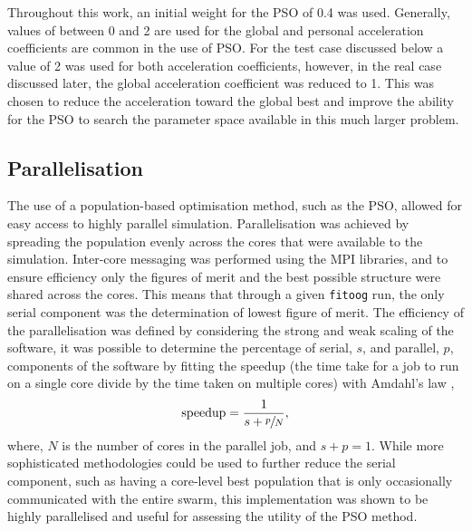 Throughout this work, an initial weight for the PSO of 0.4 was used.
Generally, values of between 0 and 2 are used for the global and personal acceleration coefficients are common in the use of PSO.
For the test case discussed below a value of 2 was used for both acceleration coefficients, however, in the real case discussed later, the global acceleration coefficient was reduced to 1.
This was chosen to reduce the acceleration toward the global best and improve the ability for the PSO to search the parameter space available in this much larger problem.

\subsection{Parallelisation}
\label{sec:para}
The use of a population-based optimisation method, such as the PSO, allowed for easy access to highly parallel simulation.
Parallelisation was achieved by spreading the population evenly across the cores that were available to the simulation.
Inter-core messaging was performed using the MPI libraries, and to ensure efficiency only the figures of merit and the best possible structure were shared across the cores.
This means that through a given \texttt{fitoog} run, the only serial component was the determination of lowest figure of merit.
The efficiency of the parallelisation was defined by considering the strong and weak scaling of the software, it was possible to determine the percentage of serial, $s$, and parallel, $p$, components of the software by fitting the speedup (the time take for a job to run on a single core divide by the time taken on multiple cores) with Amdahl's law \cite{amdahl_validity_1967},
%
\begin{equation}
\text{speedup} = \frac{1}{s + \sfrac{p}{N}},
\end{equation}
%
where, $N$ is the number of cores in the parallel job, and $s + p = 1$. 
While more sophisticated methodologies could be used to further reduce the serial component, such as having a core-level best population that is only occasionally communicated with the entire swarm, this implementation was shown to be highly parallelised and useful for assessing the utility of the PSO method.
